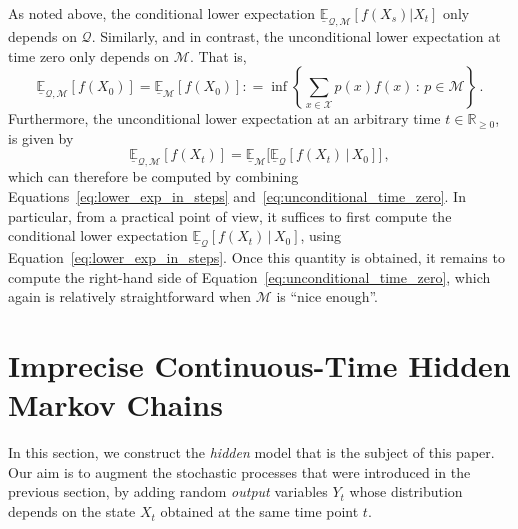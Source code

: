 \documentclass[twoside,11pt]{article}
\newcommand{\reals}{\mathbb{R}}
\newcommand{\realsnonneg}{\reals_{\geq 0}}
\newcommand{\states}{\mathcal{X}}
\newcommand{\lexp}{\underline{\mathbb{E}}_{\rateset,\mathcal{M}}}
\newcommand{\rateset}{\mathcal{Q}}
\newcommand{\coloneqq}{:\!=}
\begin{document}
As noted above, the conditional lower expectation $\lexp[f(X_s)\vert X_t]$ only depends on $\rateset$. Similarly, and in contrast, the unconditional lower expectation at time zero only depends on $\mathcal{M}$. That is,
\begin{equation}\label{eq:unconditional_time_zero}
\lexp[f(X_0)] = \underline{\mathbb{E}}_{\mathcal{M}}[f(X_0)] \coloneqq \inf\left\{ \sum_{x\in\states}p(x)f(x)\,:\,p\in\mathcal{M} \right\}\,.
\end{equation}
Furthermore, the unconditional lower expectation at an arbitrary time $t\in\realsnonneg$, is given by
\begin{equation}\label{eq:unconditional_lower_exp}
\underline{\mathbb{E}}_{\rateset,\mathcal{M}}[f(X_t)] = \underline{\mathbb{E}}_{\mathcal{M}}\bigl[\underline{\mathbb{E}}_{\rateset}[f(X_t)\,\vert\,X_0]\bigr]\,,
\end{equation}
which can therefore be computed by combining Equations~\eqref{eq:lower_exp_in_steps} and~\eqref{eq:unconditional_time_zero}. In particular, from a practical point of view, it suffices to first compute the conditional lower expectation $\underline{\mathbb{E}}_{\rateset}[f(X_t)\,\vert\,X_0]$, using Equation~\eqref{eq:lower_exp_in_steps}. Once this quantity is obtained, it remains to compute the right-hand side of Equation~\eqref{eq:unconditional_time_zero}, which again is relatively straightforward when $\mathcal{M}$ is ``nice enough''.

\section{Imprecise Continuous-Time Hidden Markov Chains}\label{sec:icthmc}

In this section, we construct the \emph{hidden} model that is the subject of this paper. Our aim is to augment the stochastic processes that were introduced in the previous section, by adding random \emph{output} variables $Y_t$ whose distribution depends on the state $X_t$ obtained at the same time point $t$.

\end{document}
